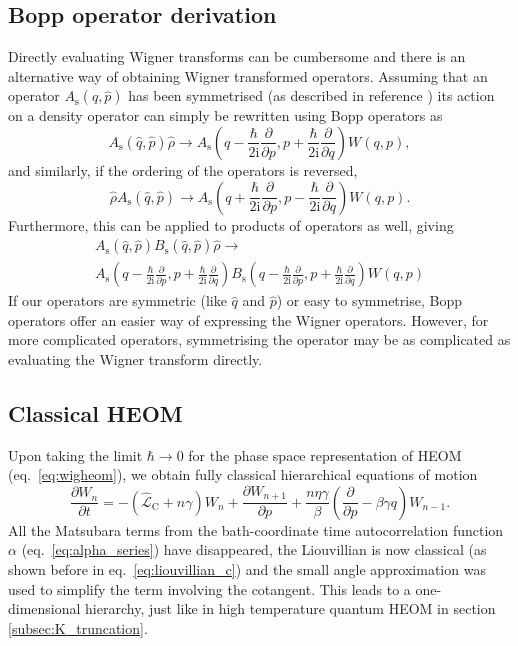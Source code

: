 \subsection{Bopp operator derivation}
Directly evaluating Wigner transforms can be cumbersome and there is an alternative way of obtaining Wigner transformed operators. Assuming that an operator $A_\mathrm{s}(\hat{q},\hat{p})$ has been symmetrised (as described in reference \cite{Kubo1964}) its action on a density operator can simply be rewritten using Bopp operators as\supercite{Kubo1964,Hillery1984}
\begin{equation}
	A_\mathrm{s}(\hat{q},\hat{p})\hat{\rho} \longrightarrow	A_\mathrm{s}\left(q-\frac{\hbar}{2\mathrm{i}}\frac{\partial}{\partial p},p+\frac{\hbar}{2\mathrm{i}}\frac{\partial}{\partial q}\right)W(q,p),
\end{equation}
and similarly, if the ordering of the operators is reversed,
\begin{equation}
\hat{\rho}A_\mathrm{s}(\hat{q},\hat{p}) \longrightarrow
A_\mathrm{s}\left(q+\frac{\hbar}{2\mathrm{i}}\frac{\partial}{\partial p},p-\frac{\hbar}{2\mathrm{i}}\frac{\partial}{\partial q}\right)W(q,p).
\end{equation}
Furthermore, this can be applied to products of operators as well, giving
\begin{multline}
	A_\mathrm{s}(\hat{q},\hat{p})B_\mathrm{s}(\hat{q},\hat{p})\hat{\rho} \longrightarrow \\ A_\mathrm{s}\left(q-\frac{\hbar}{2\mathrm{i}}\frac{\partial}{\partial p},p+\frac{\hbar}{2\mathrm{i}}\frac{\partial}{\partial q}\right)B_\mathrm{s}\left(q-\frac{\hbar}{2\mathrm{i}}\frac{\partial}{\partial p},p+\frac{\hbar}{2\mathrm{i}}\frac{\partial}{\partial q}\right)W(q,p)
\end{multline}
If our operators are symmetric (like $\hat{q}$ and $\hat{p}$) or easy to symmetrise, Bopp operators offer an easier way of expressing the Wigner operators. However, for more complicated operators, symmetrising the operator may be as complicated as evaluating the Wigner transform directly.\supercite{Kubo1964}

\subsection{Classical HEOM}
Upon taking the limit $\hbar \to 0$ for the phase space representation of HEOM (eq.~\ref{eq:wigheom}), we obtain fully classical hierarchical equations of motion
\begin{equation}
	\frac{\partial W_{n}}{\partial t}=-\left(\hat{\mathcal{L}}_\mathrm{C} +n \gamma \right)W_{n}
	+ \frac{\partial W_{n+1}}{\partial p}
	+\frac{n\eta\gamma}{\beta} \left(\frac{\partial}{\partial p} - \beta \gamma q\right)W_{n-1}.
	\label{eq:cheom}
\end{equation}
All the Matsubara terms from the bath-coordinate time autocorrelation function $\alpha$ (eq.~\ref{eq:alpha_series}) have disappeared, the Liouvillian is now classical (as shown before in eq.~\ref{eq:liouvillian_c}) and the small angle approximation was used to simplify the term involving the cotangent. This leads to a one-dimensional hierarchy, just like in high temperature quantum HEOM in section \ref{subsec:K_truncation}.

